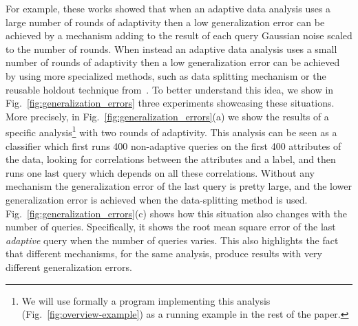 For example, these works showed that when an adaptive data analysis uses a large number of rounds of adaptivity then a low generalization error can be achieved by a mechanism  
adding to the result of each query Gaussian noise scaled to the number of rounds. When instead  an adaptive data analysis uses a small number of rounds of adaptivity then a low generalization error can be achieved by using more specialized methods, such as data splitting mechanism or the reusable holdout technique from~\citet{DworkFHPRR15}.
To better understand this idea, we show in Fig.~\ref{fig:generalization_errors} three experiments showcasing these situations. More precisely, in Fig.~\ref{fig:generalization_errors}(a) we show the results of a specific analysis\footnote{We will use formally a program implementing this analysis (Fig.~\ref{fig:overview-example}) as a running example in the rest of the paper.} with two rounds of adaptivity. This analysis can be seen as a classifier which first runs 400 non-adaptive queries on the first 400 attributes of the data, looking for correlations between the attributes and a label, and then runs one last query which depends on all these correlations. Without any mechanism the generalization error of the last query is pretty large, and the lower generalization error is achieved when the data-splitting method is used. Fig.~\ref{fig:generalization_errors}(c) shows how this situation also changes with the number of queries. Specifically, it shows the root mean square error of the last \emph{adaptive} query when the number of queries varies. This also highlights the fact that different mechanisms, for the same analysis, produce results with very different generalization errors.
